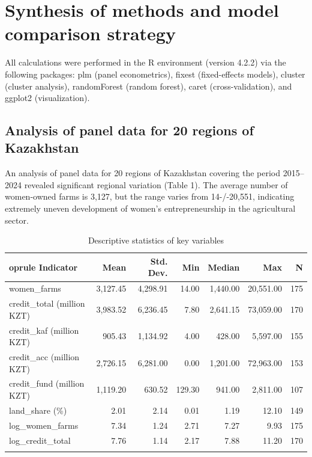 ﻿\documentclass[pdflatex,sn-mathphys-ay]{sn-jnl}
\begin{document}
\section{Synthesis of methods and model comparison strategy}

All calculations were performed in the R environment (version 4.2.2)
via the following packages: plm (panel econometrics), fixest
(fixed-effects models), cluster (cluster analysis), randomForest (random
forest), caret (cross-validation), and ggplot2 (visualization).

\subsection{Analysis of panel data for 20 regions of Kazakhstan}

An analysis of panel data for 20 regions of Kazakhstan covering the
period 2015--2024 revealed significant regional variation (Table 1). The
average number of women-owned farms is 3,127, but the range varies from
14-/-20,551, indicating extremely uneven development of women's
entrepreneurship in the agricultural sector.

\begin{table}[htbp]
\caption{Descriptive statistics of key variables}\label{tab:descriptive}
\small
\begin{tabular*}{\textwidth}{@{\extracolsep{\fill}}p{}rrrrrr@{}}
	oprule
Indicator & Mean & Std. Dev. & Min & Median & Max & N\\
\midrule
women\_farms & 3,127.45 & 4,298.91 & 14.00 & 1,440.00 & 20,551.00 & 175\\
credit\_total (million KZT) & 3,983.52 & 6,236.45 & 7.80 & 2,641.15 & 73,059.00 & 170\\
credit\_kaf (million KZT) & 905.43 & 1,134.92 & 4.00 & 428.00 & 5,597.00 & 155\\
credit\_acc (million KZT) & 2,726.15 & 6,281.00 & 0.00 & 1,201.00 & 72,963.00 & 153\\
credit\_fund (million KZT) & 1,119.20 & 630.52 & 129.30 & 941.00 & 2,811.00 & 107\\
land\_share (\%) & 2.01 & 2.14 & 0.01 & 1.19 & 12.10 & 149\\
log\_women\_farms & 7.34 & 1.24 & 2.71 & 7.27 & 9.93 & 175\\
log\_credit\_total & 7.76 & 1.14 & 2.17 & 7.88 & 11.20 & 170\\
\botrule
\end{tabular*}
\end{table}
\end{document}
